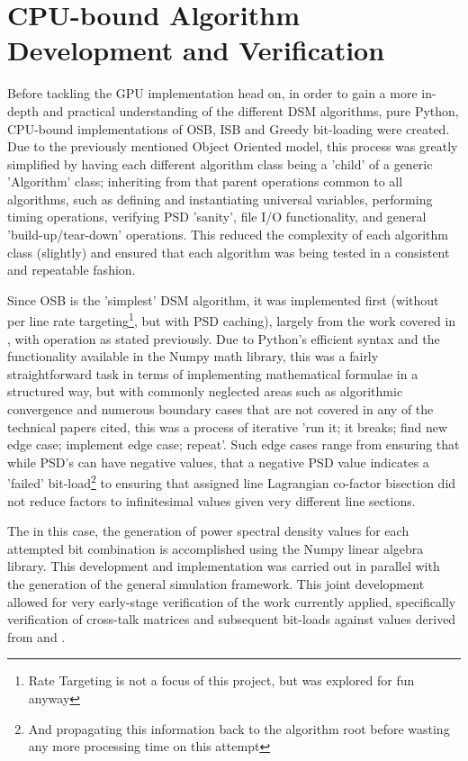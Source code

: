 \section{CPU-bound Algorithm Development and Verification}
\label{sec:algo-dev-cpu}
Before tackling the GPU implementation head on, in order to gain a more in-depth and practical understanding of the different DSM algorithms, pure Python, CPU-bound implementations of OSB, ISB and Greedy bit-loading were created. Due to the previously mentioned Object Oriented model, this process was greatly simplified by having each different algorithm class being a 'child' of a generic 'Algorithm' class; inheriting from that parent operations common to all algorithms, such as defining and instantiating universal variables, performing timing operations, verifying PSD 'sanity', file I/O functionality, and general 'build-up/tear-down' operations. This reduced the complexity of each algorithm class (slightly) and ensured that each algorithm was being tested in a consistent and repeatable fashion.

Since OSB is the 'simplest' DSM algorithm, it was implemented first (without per line rate targeting\footnote{Rate Targeting is not a focus of this project, but was explored for fun anyway}, but with PSD caching), largely from the work covered in \cite{AM09}, with operation as stated previously. Due to Python's efficient syntax and the functionality available in the Numpy math library, this was a fairly straightforward task in terms of implementing mathematical formulae in a structured way, but with commonly neglected areas such as algorithmic convergence and numerous boundary cases that are not covered in any of the technical papers cited, this was a process of iterative 'run it; it breaks; find new edge case; implement edge case; repeat'. Such edge cases range from ensuring that while PSD's can have negative values, that a negative PSD value indicates a 'failed' bit-load\footnote{And propagating this information back to the algorithm root before wasting any more processing time on this attempt} to ensuring that assigned line Lagrangian co-factor bisection did not reduce factors to infinitesimal values given very different line sections. 

The in this case, the generation of power spectral density values for each attempted bit combination is accomplished using the Numpy linear algebra library. This development and implementation was carried out in parallel with the generation of the general simulation framework. This joint development allowed for very early-stage verification of the work currently applied, specifically verification of cross-talk matrices and subsequent bit-loads against values derived from \cite{AM09} and \cite{RC04}.


